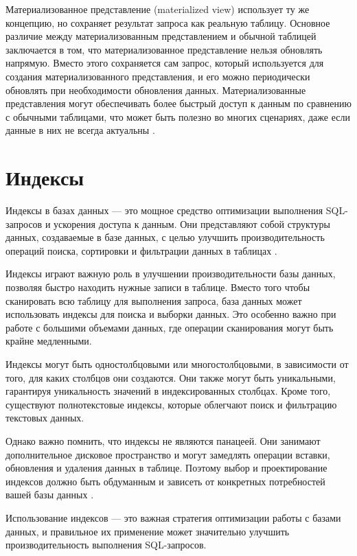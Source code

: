 \documentclass{bmstu}
\begin{document}
Материализованное представление (materialized view) использует ту же концепцию, но сохраняет результат запроса как реальную таблицу. Основное различие между материализованным представлением и обычной таблицей заключается в том, что материализованное представление нельзя обновлять напрямую. Вместо этого сохраняется сам запрос, который используется для создания материализованного представления, и его можно периодически обновлять при необходимости обновления данных. Материализованные представления могут обеспечивать более быстрый доступ к данным по сравнению с обычными таблицами, что может быть полезно во многих сценариях, даже если данные в них не всегда актуальны \cite{seventhOptSQL}.

\section{Индексы}

Индексы в базах данных --- это мощное средство оптимизации выполнения SQL-запросов и ускорения доступа к данным. Они представляют собой структуры данных, создаваемые в базе данных, с целью улучшить производительность операций поиска, сортировки и фильтрации данных в таблицах \cite{eighthOptSQL}.

Индексы играют важную роль в улучшении производительности базы данных, позволяя быстро находить нужные записи в таблице. Вместо того чтобы сканировать всю таблицу для выполнения запроса, база данных может использовать индексы для поиска и выборки данных. Это особенно важно при работе с большими объемами данных, где операции сканирования могут быть крайне медленными.

Индексы могут быть одностолбцовыми или многостолбцовыми, в зависимости от того, для каких столбцов они создаются. Они также могут быть уникальными, гарантируя уникальность значений в индексированных столбцах. Кроме того, существуют полнотекстовые индексы, которые облегчают поиск и фильтрацию текстовых данных.

Однако важно помнить, что индексы не являются панацеей. Они занимают дополнительное дисковое пространство и могут замедлять операции вставки, обновления и удаления данных в таблице. Поэтому выбор и проектирование индексов должно быть обдуманным и зависеть от конкретных потребностей вашей базы данных \cite{tenthOptSQL}.

Использование индексов --- это важная стратегия оптимизации работы с базами данных, и правильное их применение может значительно улучшить производительность выполнения SQL-запросов.
\end{document}
